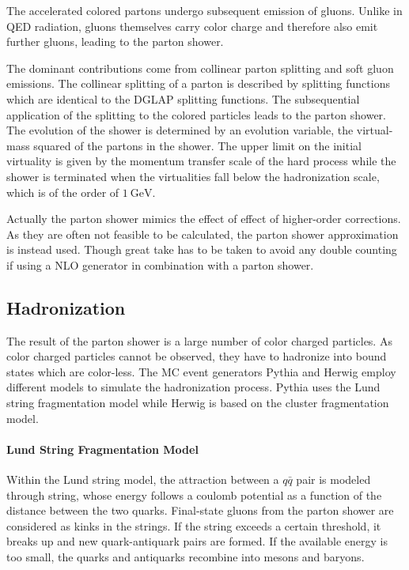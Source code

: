 The accelerated colored partons undergo subsequent emission of gluons. Unlike in
QED radiation, gluons themselves carry color charge and therefore also emit
further gluons, leading to the parton shower. 

The dominant contributions come from collinear parton splitting and soft gluon
emissions. The collinear splitting of a parton is described by splitting
functions which are identical to the DGLAP splitting functions. The
subsequential application of the splitting to the colored particles leads to the
parton shower. The evolution of the shower is determined by an evolution
variable, \eg the virtual-mass squared of the partons in the shower. The upper
limit on the initial virtuality is given by the momentum transfer scale of the
hard process while the shower is terminated when the virtualities fall below the
hadronization scale, which is of the order of $\SI{1}{\GeV}$.

Actually the parton shower mimics the effect of effect of higher-order
corrections. As they are often not feasible to be calculated, the parton shower
approximation is instead used. Though great take has to be taken to avoid any
double counting if using a NLO generator in combination with a parton shower.


\subsection{Hadronization}

The result of the parton shower is a large number of color charged particles. As
color charged particles cannot be observed, they have to hadronize into bound
states which are color-less. The MC event generators Pythia and Herwig employ
different models to simulate the hadronization process. Pythia uses the Lund
string fragmentation model while Herwig is based on the cluster fragmentation
model.

\paragraph{Lund String Fragmentation Model}

Within the Lund string model, the attraction between a $q\bar q$ pair is
modeled through string, whose energy follows a coulomb potential as a function
of the distance between the two quarks. Final-state gluons from the parton
shower are considered as kinks in the strings. If the string exceeds a certain
threshold, it breaks up and new quark-antiquark pairs are formed. If the
available energy is too small, the quarks and antiquarks recombine into mesons
and baryons.

